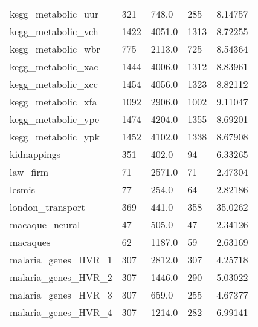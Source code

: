 \begin{longtable}{lllll}
 kegg\_metabolic\_uur                                 & 321        & 748.0       & 285   & 8.14757    \\
 kegg\_metabolic\_vch                                 & 1422       & 4051.0      & 1313  & 8.72255    \\
 kegg\_metabolic\_wbr                                 & 775        & 2113.0      & 725   & 8.54364    \\
 kegg\_metabolic\_xac                                 & 1444       & 4006.0      & 1312  & 8.83961    \\
 kegg\_metabolic\_xcc                                 & 1454       & 4056.0      & 1323  & 8.82112    \\
 kegg\_metabolic\_xfa                                 & 1092       & 2906.0      & 1002  & 9.11047    \\
 kegg\_metabolic\_ype                                 & 1474       & 4204.0      & 1355  & 8.69201    \\
 kegg\_metabolic\_ypk                                 & 1452       & 4102.0      & 1338  & 8.67908    \\
 kidnappings                                        & 351        & 402.0       & 94    & 6.33265    \\
 law\_firm                                           & 71         & 2571.0      & 71    & 2.47304    \\
 lesmis                                             & 77         & 254.0       & 64    & 2.82186    \\
 london\_transport                                   & 369        & 441.0       & 358   & 35.0262    \\
 macaque\_neural                                     & 47         & 505.0       & 47    & 2.34126    \\
 macaques                                           & 62         & 1187.0      & 59    & 2.63169    \\
 malaria\_genes\_HVR\_1                                & 307        & 2812.0      & 307   & 4.25718    \\
 malaria\_genes\_HVR\_2                                & 307        & 1446.0      & 290   & 5.03022    \\
 malaria\_genes\_HVR\_3                                & 307        & 659.0       & 255   & 4.67377    \\
 malaria\_genes\_HVR\_4                                & 307        & 1214.0      & 282   & 6.99141    \\

\end{longtable}
